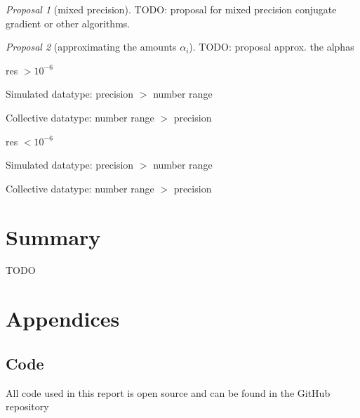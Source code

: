 \documentclass{article}
\theoremstyle{plain} %
\theoremstyle{remark} %
\newtheorem{proposal}{Proposal}[section]
\numberwithin{equation}{section}
\begin{document}
\begin{proposal}[mixed precision]

TODO: proposal for mixed precision conjugate gradient or other algorithms.

\end{proposal}

\begin{proposal}[approximating the amounts $\alpha_i$]

TODO: proposal approx. the alphas

\end{proposal}

res $> 10^{-6}$

Simulated datatype: precision $>$ number range

Collective datatype: number range $>$ precision

res $< 10^{-6}$

Simulated datatype: precision $>$ number range

Collective datatype: number range $>$ precision

\section{Summary}

TODO

\newpage




\newpage

\appendix
\section*{Appendices}
\renewcommand{\thesubsection}{\Alph{subsection}}

\subsection{Code}
\label{sec:code}

All code used in this report is open source and can be found in the GitHub repository \cite{github}

\printglossary[type=\acronymtype]

\printglossary
\end{document}
